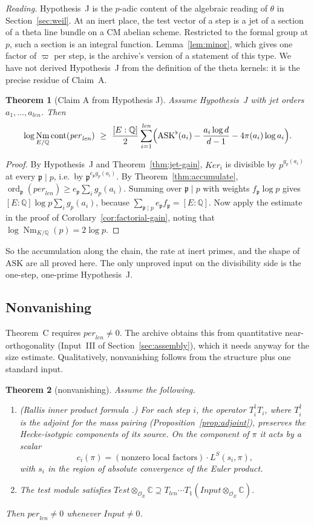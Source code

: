 \documentclass[11pt]{amsart}
\newtheorem{theorem}{Theorem}[section]
\theoremstyle{definition}
\theoremstyle{remark}
\newcommand{\OEring}{\mathcal{O}_E}
\newcommand{\Input}{\mathit{Input}}
\newcommand{\Test}{\mathit{Test}}
\newcommand{\per}{\mathit{per}}
\newcommand{\len}{\mathit{len}}
\newcommand{\Ker}{\mathit{Ker}}
\DeclareMathOperator{\Nm}{Nm}
\DeclareMathOperator{\ord}{ord}
\DeclareMathOperator{\cont}{cont}
\newcommand{\Q}{\mathbb{Q}}
\newcommand{\C}{\mathbb{C}}
\newcommand{\pp}{\mathfrak{p}}
\newcommand{\ASK}{\mathrm{ASK}}
\begin{document}
\noindent\emph{Reading.} Hypothesis~J is the $p$-adic content of the algebraic reading of $\theta$ in Section~\ref{sec:weil}. At an inert place, the test vector of a step is a jet of a section of a theta line bundle on a CM abelian scheme. Restricted to the formal group at $p$, such a section is an integral function. Lemma~\ref{lem:minor}, which gives one factor of $\varpi$ per step, is the archive's version of a statement of this type. We have not derived Hypothesis~J from the definition of the theta kernels: it is the precise residue of Claim~A.

\begin{theorem}[Claim A from Hypothesis J]\label{thm:claimA}
Assume Hypothesis~J with jet orders $a_1,\dots,a_\len$. Then
\[
\log\Nm_{E/\Q}\cont(\per_\len)\ \ge\ \frac{[E:\Q]}2\sum_{i=1}^{\len}\Bigl(\ASK^\flat(a_i)-\frac{a_i\log d}{d-1}-4\pi(a_i)\log a_i\Bigr).
\]
\end{theorem}

\begin{proof}
By Hypothesis~J and Theorem~\ref{thm:jet-gain}, $\Ker_i$ is divisible by $p^{g_p(a_i)}$ at every $\pp\mid p$, i.e.\ by $\pp^{e_\pp g_p(a_i)}$. By Theorem~\ref{thm:accumulate}, $\ord_\pp(\per_\len)\ge e_\pp\sum_ig_p(a_i)$. Summing over $\pp\mid p$ with weights $f_\pp\log p$ gives $[E:\Q]\log p\sum_ig_p(a_i)$, because $\sum_{\pp\mid p}e_\pp f_\pp=[E:\Q]$. Now apply the estimate in the proof of Corollary~\ref{cor:factorial-gain}, noting that $\log\Nm_{K/\Q}(p)=2\log p$.
\end{proof}

So the accumulation along the chain, the rate at inert primes, and the shape of $\ASK$ are all proved here. The only unproved input on the divisibility side is the one-step, one-prime Hypothesis~J.

\subsection{Nonvanishing}
Theorem~C requires $\per_\len\ne0$. The archive obtains this from quantitative near-orthogonality (Input~III of Section~\ref{sec:assembly}), which it needs anyway for the size estimate. Qualitatively, nonvanishing follows from the structure plus one standard input.

\begin{theorem}[nonvanishing]\label{thm:nonvanishing}
Assume the following.
\begin{enumerate}[label=(\roman*)]
\item (Rallis inner product formula \cite{GQT}.) For each step $i$, the operator $T_i^\dagger T_i$, where $T_i^\dagger$ is the adjoint for the mass pairing (Proposition~\ref{prop:adjoint}), preserves the Hecke-isotypic components of its source. On the component of $\pi$ it acts by a scalar
\[
c_i(\pi)=(\text{nonzero local factors})\cdot L^S(s_i,\pi),
\]
with $s_i$ in the region of absolute convergence of the Euler product.
\item The test module satisfies $\Test\otimes_{\OEring}\C\supseteq T_\len\cdots T_1(\Input\otimes_{\OEring}\C)$.
\end{enumerate}
Then $\per_\len\ne0$ whenever $\Input\ne0$.
\end{theorem}
\end{document}
